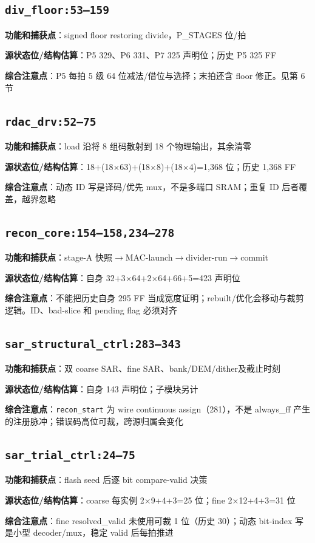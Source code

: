 \documentclass[UTF8,fontset=fandol,10pt,a4paper,openany]{ctexrep}
\newcommand{\code}[1]{\nolinkurl{#1}}
\begin{document}
\subsection*{\code{div_floor:53–159}}
\noindent\textbf{功能和捕获点}：signed floor restoring divide，P\_STAGES 位/拍\par
\noindent\textbf{源状态位/结构估算}：P5 329、P6 331、P7 325 声明位；历史 P5 325 FF\par
\noindent\textbf{综合注意点}：P5 每拍 5 级 64 位减法/借位与选择；末拍还含 floor 修正。见第 6 节\par
\subsection*{\code{rdac_drv:52–75}}
\noindent\textbf{功能和捕获点}：load 沿将 8 组码散射到 18 个物理输出，其余清零\par
\noindent\textbf{源状态位/结构估算}：18+(18\ensuremath{\times}63)+(18\ensuremath{\times}8)+(18\ensuremath{\times}4)=1,368 位；历史 1,368 FF\par
\noindent\textbf{综合注意点}：动态 ID 写是译码/优先 mux，不是多端口 SRAM；重复 ID 后者覆盖，越界忽略\par
\subsection*{\code{recon_core:154–158,234–278}}
\noindent\textbf{功能和捕获点}：stage-A 快照\ensuremath{\rightarrow}MAC-launch\ensuremath{\rightarrow}divider-run\ensuremath{\rightarrow}commit\par
\noindent\textbf{源状态位/结构估算}：自身 32+3\ensuremath{\times}64+2\ensuremath{\times}64+66+5=423 声明位\par
\noindent\textbf{综合注意点}：不能把历史自身 295 FF 当成宽度证明；rebuilt/优化会移动与裁剪逻辑。ID、bad-slice 和 pending flag 必须对齐\par
\subsection*{\code{sar_structural_ctrl:283–343}}
\noindent\textbf{功能和捕获点}：双 coarse SAR、fine SAR、bank/DEM/dither及截止时刻\par
\noindent\textbf{源状态位/结构估算}：自身 143 声明位；子模块另计\par
\noindent\textbf{综合注意点}：\code{recon_start} 为 wire continuous assign（281），不是 always\_ff 产生的注册脉冲；错误码高位可裁，跨源归属会变化\par
\subsection*{\code{sar_trial_ctrl:24–75}}
\noindent\textbf{功能和捕获点}：flash seed 后逐 bit compare-valid 决策\par
\noindent\textbf{源状态位/结构估算}：coarse 每实例 2\ensuremath{\times}9+4+3=25 位；fine 2\ensuremath{\times}12+4+3=31 位\par
\noindent\textbf{综合注意点}：fine resolved\_valid 未使用可裁 1 位（历史 30）；动态 bit-index 写是小型 decoder/mux，稳定 valid 后每拍推进\par
\end{document}
